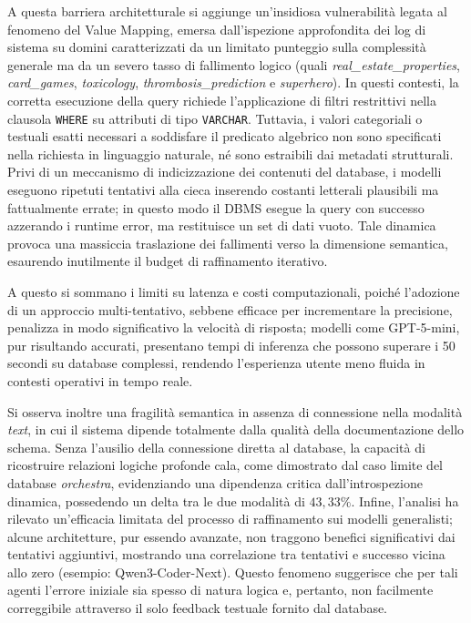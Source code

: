 A questa barriera architetturale si aggiunge un'insidiosa vulnerabilità
legata al fenomeno del Value Mapping, emersa dall'ispezione
approfondita dei log di sistema su domini caratterizzati da un limitato
punteggio sulla complessità generale ma da un severo tasso di fallimento
logico (quali \emph{real\_estate\_properties}, \emph{card\_games},
\emph{toxicology}, \emph{thrombosis\_prediction} e \emph{superhero}). In
questi contesti, la corretta esecuzione della query richiede
l'applicazione di filtri restrittivi nella clausola \texttt{WHERE} su
attributi di tipo \texttt{VARCHAR}. Tuttavia, i valori categoriali o
testuali esatti necessari a soddisfare il predicato algebrico non sono
specificati nella richiesta in linguaggio naturale, né sono estraibili
dai metadati strutturali. Privi di un meccanismo di indicizzazione dei
contenuti del database, i modelli eseguono ripetuti tentativi alla
cieca inserendo costanti letterali plausibili ma fattualmente errate;
in questo modo il DBMS esegue la query con successo azzerando i runtime
error, ma restituisce un set di dati vuoto. Tale dinamica provoca una
massiccia traslazione dei fallimenti verso la dimensione semantica,
esaurendo inutilmente il budget di raffinamento iterativo.

A questo si sommano i limiti su latenza e costi computazionali, poiché
l'adozione di un approccio multi-tentativo, sebbene efficace per
incrementare la precisione, penalizza in modo significativo la velocità
di risposta; modelli come GPT-5-mini, pur risultando accurati,
presentano tempi di inferenza che possono superare i 50 secondi su
database complessi, rendendo l'esperienza utente meno fluida in contesti
operativi in tempo reale.

Si osserva inoltre una fragilità semantica in assenza di connessione
nella modalità \emph{text}, in cui il sistema dipende totalmente dalla
qualità della documentazione dello schema. Senza l'ausilio della
connessione diretta al database, la capacità di ricostruire relazioni
logiche profonde cala, come dimostrato dal caso limite del
database \emph{orchestra}, evidenziando una dipendenza critica
dall'introspezione dinamica, possedendo un delta tra le due modalità di \(43,33\%\). 
Infine, l'analisi ha rilevato un'efficacia
limitata del processo di raffinamento sui modelli generalisti;
alcune architetture, pur essendo avanzate, non traggono benefici
significativi dai tentativi aggiuntivi, mostrando una correlazione tra
tentativi e successo vicina allo zero (esempio: Qwen3-Coder-Next). Questo fenomeno suggerisce che
per tali agenti l'errore iniziale sia spesso di natura logica e,
pertanto, non facilmente correggibile attraverso il solo feedback
testuale fornito dal database.

